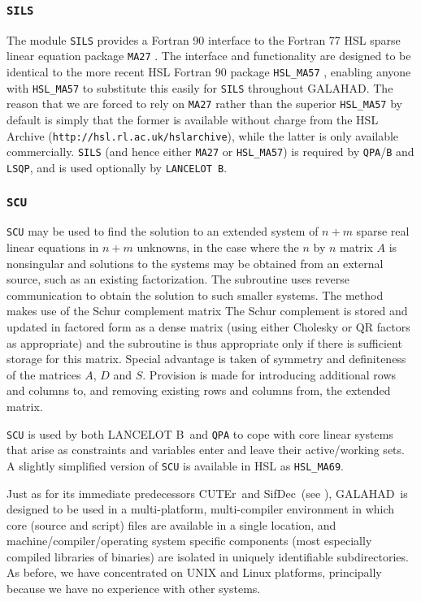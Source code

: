 \documentclass[twoside]{article}
\newcommand{\gal}{{\sf GALAHAD}}
\newcommand{\lanb}{{\sf LANCELOT B}}
\newcommand{\cuter}{{\sf CUTEr}}
\newcommand{\sifdec}{{\sf SifDec}}
\newcommand{\ltsubsubsection}[1]{\subsubsection{{\tt #1}} \label{#1}}
\begin{document}
\ltsubsubsection{SILS}

The module {\tt SILS} provides a Fortran 90 interface to the Fortran 77 HSL
sparse linear equation package {\tt MA27} \cite{DuffReid82}.
The interface and functionality are
designed to be identical to the more recent HSL Fortran 90
package {\tt HSL\_MA57} \cite{Duff01}, enabling anyone with {\tt HSL\_MA57}
to substitute this easily for {\tt SILS} throughout \gal. The reason
that we are forced to rely on {\tt MA27} rather than the superior
{\tt HSL\_MA57} by default is simply that
the former is available without charge from the HSL Archive
({\tt http://hsl.rl.ac.uk/hslarchive}), while the latter is only available
commercially.
{\tt SILS} (and hence either {\tt MA27} or {\tt HSL\_MA57})
is required by {\tt QPA}/{\tt B} and {\tt LSQP}, and is
used optionally by {\tt LANCELOT B}.

\ltsubsubsection{SCU}

{\tt SCU} may be used to find the solution
to an extended system of $n + m$
sparse real linear equations in $n  +  m$ unknowns,
in the case where the $n$ by $n$ matrix $A$ is nonsingular
and solutions to the systems
may be obtained from an external source, such as an existing
factorization.  The subroutine uses reverse communication to obtain
the solution to such smaller systems.  The method makes use of
the Schur complement matrix
The Schur complement is stored and updated in factored form as a dense matrix
(using either Cholesky or QR factors as appropriate)
and the subroutine is thus appropriate only if there is
sufficient storage for this matrix. Special advantage is taken
of symmetry and definiteness of the matrices $A$, $D$ and $S$.
Provision is made for introducing additional rows and columns
to, and removing existing rows and columns from, the extended matrix.

{\tt SCU} is used by both \lanb\ and {\tt QPA} to cope
with core linear systems that arise as constraints and variables
enter and leave their active/working sets. A slightly simplified
version of {\tt SCU} is available in HSL as {\tt HSL\_MA69}.


Just as for its immediate predecessors \cuter\ and \sifdec\
(see ),
\gal\ is designed to be used in a multi-platform, multi-compiler
environment in which core (source and script) files are available
in a single location, and machine/compiler/operating system specific
components (most especially compiled libraries of binaries) are isolated in
uniquely identifiable subdirectories. As before, we have concentrated on
UNIX and Linux platforms, principally because we have no experience with
other systems.
\end{document}
